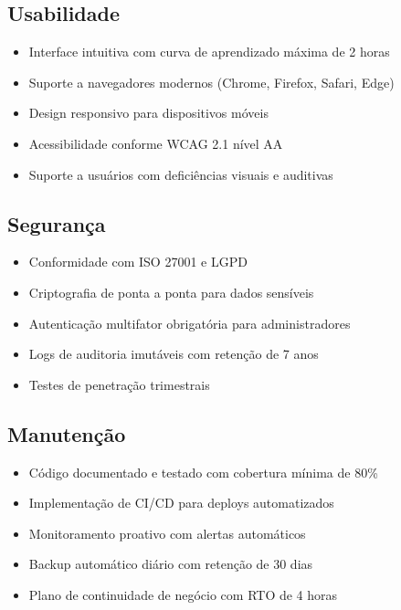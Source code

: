 \documentclass[12pt,a4paper]{article}
\begin{document}
\subsection{Usabilidade}

\begin{itemize}[leftmargin=*]
    \item Interface intuitiva com curva de aprendizado máxima de 2 horas
    \item Suporte a navegadores modernos (Chrome, Firefox, Safari, Edge)
    \item Design responsivo para dispositivos móveis
    \item Acessibilidade conforme WCAG 2.1 nível AA
    \item Suporte a usuários com deficiências visuais e auditivas
\end{itemize}

\subsection{Segurança}

\begin{itemize}[leftmargin=*]
    \item Conformidade com ISO 27001 e LGPD
    \item Criptografia de ponta a ponta para dados sensíveis
    \item Autenticação multifator obrigatória para administradores
    \item Logs de auditoria imutáveis com retenção de 7 anos
    \item Testes de penetração trimestrais
\end{itemize}

\subsection{Manutenção}

\begin{itemize}[leftmargin=*]
    \item Código documentado e testado com cobertura mínima de 80\%
    \item Implementação de CI/CD para deploys automatizados
    \item Monitoramento proativo com alertas automáticos
    \item Backup automático diário com retenção de 30 dias
    \item Plano de continuidade de negócio com RTO de 4 horas
\end{itemize}
\end{document}
